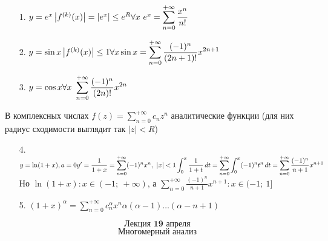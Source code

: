 \documentclass[12pt, letterpaper, twoside]{article}
\newcommand{\DS}{\displaystyle}
\newcommand{\oo}{\infty}
\newcommand{\Abs}[1]{\left| #1 \right|}
\begin{document}
    \begin{enumerate}
        \item[1.] $y = e^x\\
        \Abs{f^{(k)}(x)} = \Abs{ e^x } \leq e^{R}\\
        \forall x\ e^x =\DS \sum_{n = 0}^{+\oo} \frac{x^n}{n!}$
        \item[2.] $y = \sin x\\
        \Abs{ f^{(k)}(x) } \leq 1\\
        \forall x \sin x = \DS \sum_{n = 0}^{+\oo} \frac{ (-1)^n }{ (2n + 1)! } x^{2n + 1}$
        \item[3.] $y = \cos x\\
        \DS\forall x\ \sum_{n = 0}^{+\oo} \frac{ (-1)^n }{(2n)!} x^{2n}$
    \end{enumerate}
    В комплексных числах $\DS f(z) = \sum_{n = 0}^{+\oo} c_n z^n$ аналитические функции (для них радиус сходимости выглядит так $|z| < R$)
    \begin{enumerate}
        \item[4.] $y = \ln(1 + x), a = 0\\
        y' = \dfrac{1}{1 + x} = \DS \sum_{n = 0}^{+\oo} (-1)^n x^n,\ |x| < 1\\
        \int_0^x \frac{1}{1 + t}\, dt = \sum_{n = 0}^{+\oo} \int_0^x (-1)^n t^n\, dt = \sum_{n = 0}^{+\oo} \frac{(-1)^n}{n + 1}x^{n + 1}$\\
        Но $\ln(1 + x): x \in (-1;\ +\oo)$, а $\DS \sum_{n = 0}^{+\oo} \frac{(-1)^n}{n + 1}x^{n + 1}: x \in (-1;\ 1]$
        \item[5.] $(1 + x)^{\alpha} = \DS \sum_{n  = 0}^{+\oo} c_n^{\alpha} x^n \alpha (\alpha - 1)\dots(\alpha -n + 1)$
    \end{enumerate}
    \newpage
    \[\textbf{Лекция 19 апреля}\]
    \[\textbf{Многомерный анализ}\]
    
\end{document}

